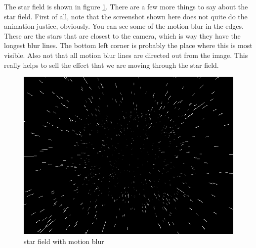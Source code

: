 \documentclass[a4paper]{article}
\begin{document}
The star field is shown in figure \ref{starfield_fig}.
There are a few more things to say about the star field.
First of all, note that the screenshot shown here does not quite do the animation justice, obviously.
You can see some of the motion blur in the edges.
These are the stars that are closest to the camera, which is way they have the longest blur lines.
The bottom left corner is probably the place where this is most visible.
Also not that all motion blur lines are directed out from the image.
This really helps to sell the effect that we are moving through the star field.

\begin{figure}[H]
\begin{center}
\includegraphics[width=\textwidth]{starfield.png}
\caption{star field with motion blur}
\label{starfield_fig}
\end{center}
\end{figure}
\end{document}
